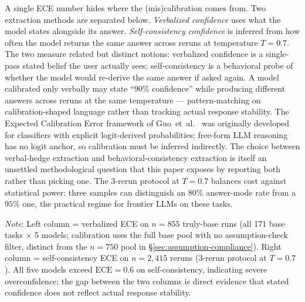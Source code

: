 A single ECE number hides where the (mis)calibration comes from.
Two extraction methods are separated below. \emph{Verbalized confidence} uses
what the model states alongside its answer. \emph{Self-consistency
confidence} is inferred from how often the model returns the same
answer across reruns at temperature $T = 0.7$.
The two measure related but distinct notions: verbalized
confidence is a single-pass stated belief the user actually
sees; self-consistency is a behavioral probe of whether the
model would re-derive the same answer if asked again. A
model calibrated only verbally may state ``90\% confidence''
while producing different answers across reruns at the same
temperature --- pattern-matching on calibration-shaped
language rather than tracking actual response stability.
The Expected Calibration Error framework of
Guo~et~al.~\cite{guo2017calibration} was originally developed
for classifiers with explicit logit-derived probabilities;
free-form LLM reasoning has no logit anchor, so calibration
must be inferred indirectly. The choice between verbal-hedge
extraction and behavioral-consistency extraction is itself an
unsettled methodological question that this paper exposes by
reporting both rather than picking one. The 3-rerun protocol
at $T = 0.7$ balances cost against statistical power: three
samples can distinguish an $80\%$ answer-mode rate from a
$95\%$ one, the practical regime for frontier LLMs on these
tasks.

\begin{table}[H]
  \centering
  \caption{Calibration ECE by Two Extraction Methods}
  \label{tab:calibration-paired}

  \vspace{2pt}
  \footnotesize{\textit{Note}: Left column = verbalized ECE on
  $n=855$ truly-base runs (all 171 base tasks $\times$ 5 models;
  calibration uses the full base pool with no assumption-check
  filter, distinct from the $n=750$ pool in
  \S\ref{sec:assumption-compliance}). Right column =
  self-consistency ECE on $n=2{,}415$ reruns (3-rerun protocol at
  $T=0.7$). All five models exceed $\text{ECE}=0.6$ on
  self-consistency, indicating severe overconfidence; the gap
  between the two columns is direct evidence that stated confidence
  does not reflect actual response stability.}
\end{table}

